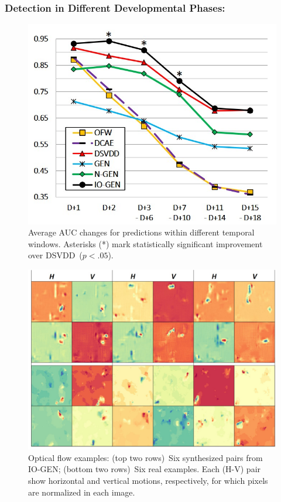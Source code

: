 \documentclass[letterpaper]{article} %
\begin{document}
\subsubsection{Detection in Different Developmental Phases:}
\label{sec:detection_in_different_developmental_phases}

\begin{figure}[t]
	\centering
	\includegraphics[width=.75\columnwidth]{auc_less_data}
	\caption{
		Average AUC changes for predictions within different temporal
		windows.
        Asterisks (*) mark statistically significant improvement over
		DSVDD~($p<.05$).
	}
	\label{fig:auc_less_data}
\end{figure}
\begin{figure}\centering
       \includegraphics[width=.75\linewidth]{real_fake_flows}
       \caption{Optical flow examples:
           (top two rows)~Six synthesized pairs from \mbox{IO-GEN};
           (bottom two rows)~Six real examples.
           Each (H-V) pair show horizontal and vertical motions,
           respectively, for which pixels are normalized in each image.
       }
       \label{fig:real_fake_flows}
\end{figure}
\end{document}
